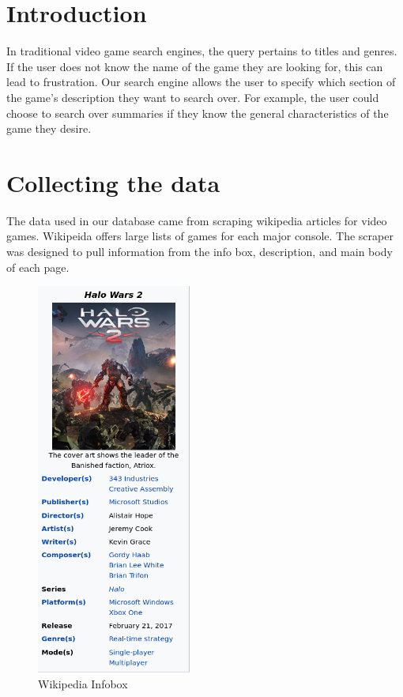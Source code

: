 \section{Introduction}

In traditional video game search engines, the query pertains to titles and genres. If the user does not know the name of the game they are looking for, this can lead to frustration. Our search engine allows the user to specify which section of the game's description they want to search over. For example, the user could choose to search over summaries if they know the general characteristics of the game they desire.

\section{Collecting the data}
The data used in our database came from scraping wikipedia articles for video games. Wikipeida offers large lists of games for each major console. The scraper was designed to pull information from the info box, description, and main body of each page.

\begin{figure}[H]
\includegraphics[width=2in]{infobox}
\caption{Wikipedia Infobox}
\label{fig:infobox}
\end{figure}

